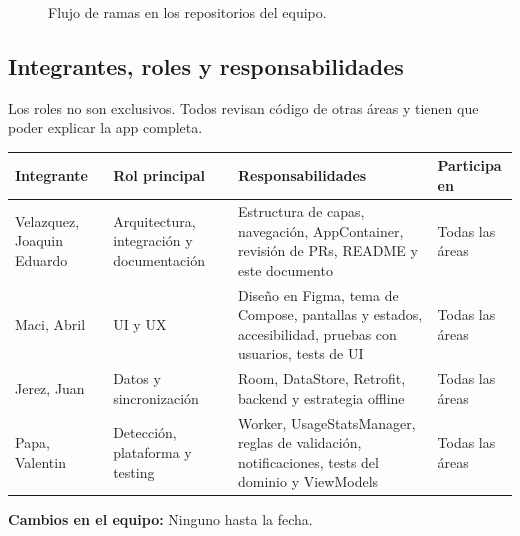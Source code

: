 \begin{figure}[H]
\centering
{}
\caption{Flujo de ramas en los repositorios del equipo.}
\end{figure}

\subsection{Integrantes, roles y responsabilidades}

Los roles no son exclusivos. Todos revisan código de otras áreas y tienen que poder explicar la app completa.

\begin{table}[H]
\centering\small
\begin{tabularx}{\textwidth}{@{}p{3.1cm} p{3.1cm} L L@{}}
\toprule
\textbf{Integrante} & \textbf{Rol principal} & \textbf{Responsabilidades} & \textbf{Participa en} \\
\midrule
Velazquez, Joaquin Eduardo & Arquitectura, integración y documentación & Estructura de capas, navegación, AppContainer, revisión de PRs, README y este documento & Todas las áreas \\
Maci, Abril & UI y UX & Diseño en Figma, tema de Compose, pantallas y estados, accesibilidad, pruebas con usuarios, tests de UI & Todas las áreas \\
Jerez, Juan & Datos y sincronización & Room, DataStore, Retrofit, backend y estrategia offline & Todas las áreas \\
Papa, Valentin & Detección, plataforma y testing & Worker, UsageStatsManager, reglas de validación, notificaciones, tests del dominio y ViewModels & Todas las áreas \\
\bottomrule
\end{tabularx}
\end{table}

\textbf{Cambios en el equipo:} Ninguno hasta la fecha.